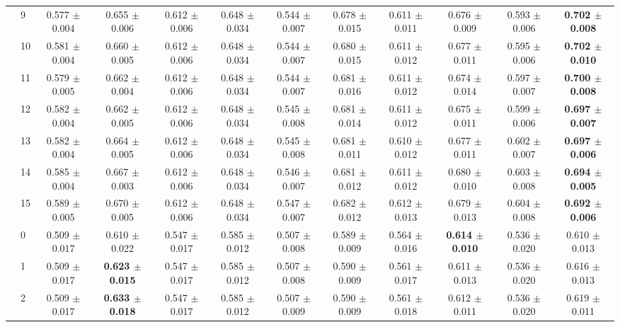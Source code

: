 \begin{table*}[t]
{\begin{tabular}{%
  ll
  @{\quad}
  c@{\hskip 4pt}c
  @{\quad\quad}
  c@{\hskip 4pt}c
  @{\quad\quad}
  c@{\hskip 4pt}c
  @{\quad\quad}
  c@{\hskip 4pt}c
  @{\quad\quad}
  c@{\hskip 4pt}c
}
        & 9 & 0.577 $\pm$ 0.004 & 0.655 $\pm$ 0.006 & 0.612 $\pm$ 0.006 & 0.648 $\pm$ 0.034 & 0.544 $\pm$ 0.007 & 0.678 $\pm$ 0.015 & 0.611 $\pm$ 0.011 & 0.676 $\pm$ 0.009 & 0.593 $\pm$ 0.006 & \textbf{0.702 $\pm$ 0.008} \\
        & 10 & 0.581 $\pm$ 0.004 & 0.660 $\pm$ 0.005 & 0.612 $\pm$ 0.006 & 0.648 $\pm$ 0.034 & 0.544 $\pm$ 0.007 & 0.680 $\pm$ 0.015 & 0.611 $\pm$ 0.012 & 0.677 $\pm$ 0.011 & 0.595 $\pm$ 0.006 & \textbf{0.702 $\pm$ 0.010} \\
        & 11 & 0.579 $\pm$ 0.005 & 0.662 $\pm$ 0.004 & 0.612 $\pm$ 0.006 & 0.648 $\pm$ 0.034 & 0.544 $\pm$ 0.007 & 0.681 $\pm$ 0.016 & 0.611 $\pm$ 0.012 & 0.674 $\pm$ 0.014 & 0.597 $\pm$ 0.007 & \textbf{0.700 $\pm$ 0.008} \\
        & 12 & 0.582 $\pm$ 0.004 & 0.662 $\pm$ 0.005 & 0.612 $\pm$ 0.006 & 0.648 $\pm$ 0.034 & 0.545 $\pm$ 0.008 & 0.681 $\pm$ 0.014 & 0.611 $\pm$ 0.012 & 0.675 $\pm$ 0.011 & 0.599 $\pm$ 0.006 & \textbf{0.697 $\pm$ 0.007} \\
        & 13 & 0.582 $\pm$ 0.004 & 0.664 $\pm$ 0.005 & 0.612 $\pm$ 0.006 & 0.648 $\pm$ 0.034 & 0.545 $\pm$ 0.008 & 0.681 $\pm$ 0.011 & 0.610 $\pm$ 0.012 & 0.677 $\pm$ 0.011 & 0.602 $\pm$ 0.007 & \textbf{0.697 $\pm$ 0.006} \\
        & 14 & 0.585 $\pm$ 0.004 & 0.667 $\pm$ 0.003 & 0.612 $\pm$ 0.006 & 0.648 $\pm$ 0.034 & 0.546 $\pm$ 0.007 & 0.681 $\pm$ 0.012 & 0.611 $\pm$ 0.012 & 0.680 $\pm$ 0.010 & 0.603 $\pm$ 0.008 & \textbf{0.694 $\pm$ 0.005} \\
        & 15 & 0.589 $\pm$ 0.005 & 0.670 $\pm$ 0.005 & 0.612 $\pm$ 0.006 & 0.648 $\pm$ 0.034 & 0.547 $\pm$ 0.007 & 0.682 $\pm$ 0.012 & 0.612 $\pm$ 0.013 & 0.679 $\pm$ 0.013 & 0.604 $\pm$ 0.008 & \textbf{0.692 $\pm$ 0.006} \\
\midrule
\assist{} & 0 & 0.509 $\pm$ 0.017 & 0.610 $\pm$ 0.022 & 0.547 $\pm$ 0.017 & 0.585 $\pm$ 0.012 & 0.507 $\pm$ 0.008 & 0.589 $\pm$ 0.009 & 0.564 $\pm$ 0.016 & \textbf{0.614 $\pm$ 0.010} & 0.536 $\pm$ 0.020 & 0.610 $\pm$ 0.013 \\
        & 1 & 0.509 $\pm$ 0.017 & \textbf{0.623 $\pm$ 0.015} & 0.547 $\pm$ 0.017 & 0.585 $\pm$ 0.012 & 0.507 $\pm$ 0.008 & 0.590 $\pm$ 0.009 & 0.561 $\pm$ 0.017 & 0.611 $\pm$ 0.013 & 0.536 $\pm$ 0.020 & 0.616 $\pm$ 0.013 \\
        & 2 & 0.509 $\pm$ 0.017 & \textbf{0.633 $\pm$ 0.018} & 0.547 $\pm$ 0.017 & 0.585 $\pm$ 0.012 & 0.507 $\pm$ 0.009 & 0.590 $\pm$ 0.009 & 0.561 $\pm$ 0.018 & 0.612 $\pm$ 0.011 & 0.536 $\pm$ 0.020 & 0.619 $\pm$ 0.011 \\

\end{tabular}}
\end{table*}
